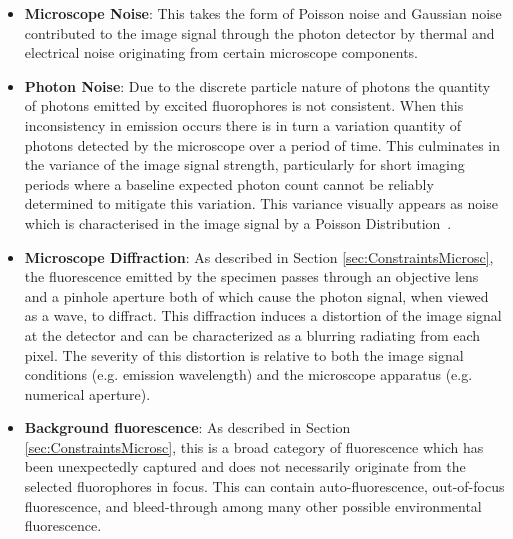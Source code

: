 \begin{itemize}
    \item \textbf{Microscope Noise}: This takes the form of Poisson noise and Gaussian noise contributed to the image signal through the photon detector by thermal and electrical noise originating from certain microscope components.
    \item \textbf{Photon Noise}: Due to the discrete particle nature of photons the quantity of photons emitted by excited fluorophores is not consistent. When this inconsistency in emission occurs there is in turn a variation quantity of photons detected by the microscope over a period of time. This culminates in the variance of the image signal strength, particularly for short imaging periods where a baseline expected photon count cannot be reliably determined to mitigate this variation. This variance visually appears as noise which is characterised in the image signal by a Poisson Distribution~\cite{Meiniel2018, PoisGauss}.  
    \item \textbf{Microscope Diffraction}: As described in Section \ref{sec:ConstraintsMicrosc}, the fluorescence emitted by the specimen passes through an objective lens and a pinhole aperture both of which cause the photon signal, when viewed as a wave, to diffract. This diffraction induces a distortion of the image signal at the detector and can be characterized as a blurring radiating from each pixel. The severity of this distortion is relative to both the image signal conditions (e.g. emission wavelength) and the microscope apparatus (e.g. numerical aperture).
    \item \textbf{Background fluorescence}: As described in Section \ref{sec:ConstraintsMicrosc}, this is a broad category of fluorescence which has been unexpectedly captured and does not necessarily originate from the selected fluorophores in focus. This can contain auto-fluorescence, out-of-focus fluorescence, and bleed-through among many other possible environmental fluorescence.
\end{itemize}

